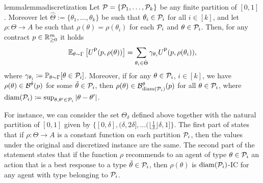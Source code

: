 \begin{restatable}{lemma}{lemmadiscretization}\label{lem:discretization}
    Let $\mathcal{P}=\{\mathcal{P}_1,\ldots,\mathcal{P}_k\}$ be any finite partition of $[0,1]$. Moreover let $\hat\Theta:=\{\theta_1,\ldots,\theta_k\}$ be such that $\theta_i\in\mathcal{P}_i$ for all $i\in[k]$, and let $\rho:\Theta\to A$ be such that $\rho(\theta)=\rho(\theta_i)$ for each $\mathcal{P}_i$ and $\theta\in\mathcal{P}_i$. Then, for any contract $p\in\mathbb{R}^m_{\ge 0}$ it holds
    \[
        \mathbb{E}_{\theta\sim\Gamma} \left[U^\textsf{P}(p, \rho(\theta))\right] = \sum_{\theta_i\in\hat\Theta} \gamma_{\theta_i} U^\textsf{P}(p, \rho(\theta_i)),
    \]
    where $\gamma_{\theta_i}\coloneqq\mathbb{P}_{\theta\sim\Gamma}[\theta\in \mathcal{P}_i]$.
    Moreover, if for any $\theta\in\mathcal{P}_i$, $i \in [k]$, we have $\rho(\theta)\in \mathcal{B}^{\tilde\theta}(p)$ for some $\tilde \theta\in \mathcal{P}_{i}$, then $\rho(\theta)\in\mathcal{B}^{\theta}_{\textnormal{diam}(\mathcal{P}_i)}(p)$ for all $\theta\in\mathcal{P}_i$, where $\textnormal{diam}(\mathcal{P}_i)\coloneqq\sup_{\theta,\theta'\in\mathcal{P}_i}|\theta-\theta'|$.
\end{restatable}

For instance, we can consider the set $\Theta_\delta$ defined above together with the natural partition of $[0,1]$ given by
\(\{[0,\delta],(\delta,2\delta],\ldots(\lfloor\frac1\delta\rfloor\delta,1]\}\).
%
The first part of  states that if $\rho:\Theta\to A$ is a constant function on each partition $\mathcal{P}_i$, then the values under the original and discretized instance are the same. The second part of the statement states that if the function $\rho$ recommends to an agent of type $\theta\in\mathcal{P}_i$ an action that is a best response to a type $\tilde\theta\in\mathcal{P}_i$, then $\rho(\theta)$ is $\textnormal{diam}(\mathcal{P}_i)$-IC for any agent with type belonging to $\mathcal{P}_i$.


